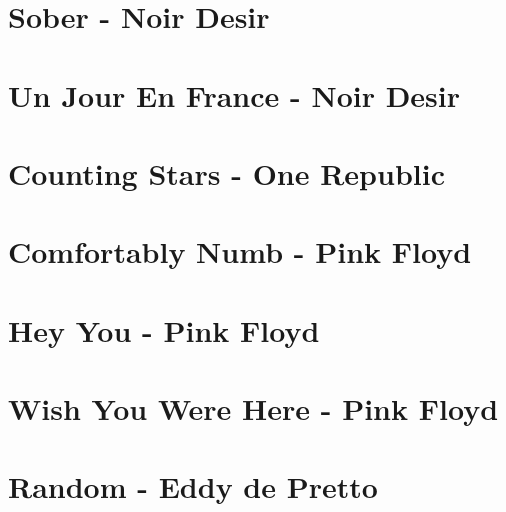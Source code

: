 \documentclass{guitartabs}
\begin{document}
\section*{Sober - Noir Desir}
\begin{guitar}

\end{guitar}


\section*{Un Jour En France - Noir Desir}
\begin{guitar}

\end{guitar}

\section{Counting Stars - One Republic}
\begin{guitar}

\end{guitar}

\section{Comfortably Numb - Pink Floyd}
\begin{guitar}

\end{guitar}


\section{Hey You - Pink Floyd}
\begin{guitar}

\end{guitar}


\section{Wish You Were Here - Pink Floyd}
\begin{guitar}

\end{guitar}



\section{Random - Eddy de Pretto}
\begin{guitar}

\end{guitar}
\end{document}
